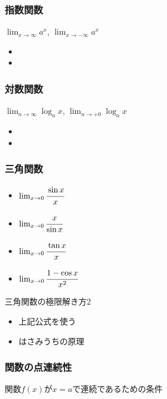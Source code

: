 \documentclass[10pt,dvipdfmx]{jsarticle}
\newcommand{\answer}[2]{{\color{orange}#2}}
\newcommand{\answer}[2]{\vspace{#1mm}}
\begin{document}
\subsubsection*{指数関数}
$\lim_{x\rightarrow\infty}a^x$, $\lim_{x\rightarrow-\infty}a^x$
\begin{Large}
  \begin{itemize}
    \item \item
  \end{itemize}
\end{Large}

\subsubsection*{対数関数}
$\lim_{n\rightarrow\infty}\log_{a}x$, $\lim_{n\rightarrow+0}\log_{a}x$
\begin{Large}
  \begin{itemize}
    \item \item
  \end{itemize}
\end{Large}

\subsubsection*{三角関数}
\begin{Large}
  \begin{itemize}
    \item $\lim_{x\rightarrow0}\cfrac{\sin x}{x}$
    \item $\lim_{x\rightarrow0}\cfrac{x}{\sin x}$
    \item $\lim_{x\rightarrow0}\cfrac{\tan x}{x}$
    \item $\lim_{x\rightarrow0}\cfrac{1-\cos x}{x^2}$
  \end{itemize}
\end{Large}

\begin{itembox}[l]{三角関数の極限解き方2}
  \begin{Large}
    \begin{itemize}
      \item \answer{0}{上記公式を使う}
      \item \answer{0}{はさみうちの原理}
    \end{itemize}
  \end{Large}
\end{itembox}

\subsubsection*{関数の点連続性}
関数$f(x)$が$x=a$で連続であるための条件
\vspace{15mm}
\end{document}
